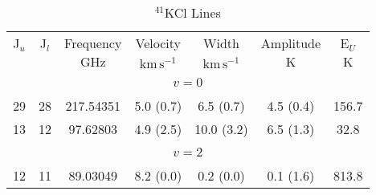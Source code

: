 \begin{table*}[htp]
\centering
\caption{$^{41}$KCl Lines}
\begin{tabular}{ccccccc}
\label{tab:41KCl_salt_lines}
 J$_u$ & J$_l$ & Frequency & Velocity & Width & Amplitude & E$_U$ \\
  &  & $\mathrm{GHz}$ & $\mathrm{km\,s^{-1}}$ & $\mathrm{km\,s^{-1}}$ & $\mathrm{K}$ & $\mathrm{K}$ \\
\hline
&\vspace{-0.75em}\\
\multicolumn{7}{c}{$v = 0$} \\
\vspace{-0.75em}\\
 29 & 28 & 217.54351 & 5.0 (0.7) & 6.5 (0.7) & 4.5 (0.4) & 156.7 \\
 13 & 12 & 97.62803 & 4.9 (2.5) & 10.0 (3.2) & 6.5 (1.3) & 32.8 \\
&\vspace{-0.75em}\\
\multicolumn{7}{c}{$v = 2$} \\
\vspace{-0.75em}\\
 12 & 11 & 89.03049 & 8.2 (0.0) & 0.2 (0.0) & 0.1 (1.6) & 813.8 \\
\hline
\end{tabular}

\par 
\end{table*}
